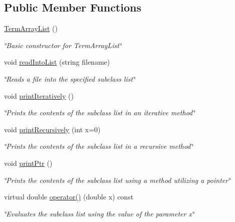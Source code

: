 \subsection*{Public Member Functions}
\begin{DoxyCompactItemize}
\item 
\hypertarget{classTermArrayList_a6c4ad3fa148ee300e41f1d8fae021451}{\hyperlink{classTermArrayList_a6c4ad3fa148ee300e41f1d8fae021451}{Term\-Array\-List} ()}\label{classTermArrayList_a6c4ad3fa148ee300e41f1d8fae021451}

\begin{DoxyCompactList}\small\item\em \char`\"{}\-Basic constructor for Term\-Array\-List\char`\"{} \end{DoxyCompactList}\item 
void \hyperlink{classTermArrayList_a7abb9dc265a5d89e31bfa9caf0a0add3}{read\-Into\-List} (string filename)
\begin{DoxyCompactList}\small\item\em \char`\"{}\-Reads a file into the specified subclass list\char`\"{} \end{DoxyCompactList}\item 
\hypertarget{classTermArrayList_a1c6a97fd1ba740bcddd6ee257ff4a088}{void \hyperlink{classTermArrayList_a1c6a97fd1ba740bcddd6ee257ff4a088}{print\-Iteratively} ()}\label{classTermArrayList_a1c6a97fd1ba740bcddd6ee257ff4a088}

\begin{DoxyCompactList}\small\item\em \char`\"{}\-Prints the contents of the subclass list in an iterative method\char`\"{} \end{DoxyCompactList}\item 
void \hyperlink{classTermArrayList_a6777d9358149d683902610c24c4752f6}{print\-Recursively} (int x=0)
\begin{DoxyCompactList}\small\item\em \char`\"{}\-Prints the contents of the subclass list in a recursive method\char`\"{} \end{DoxyCompactList}\item 
\hypertarget{classTermArrayList_a0619e7312f7af5c17ef029995029fa0d}{void \hyperlink{classTermArrayList_a0619e7312f7af5c17ef029995029fa0d}{print\-Ptr} ()}\label{classTermArrayList_a0619e7312f7af5c17ef029995029fa0d}

\begin{DoxyCompactList}\small\item\em \char`\"{}\-Prints the contents of the subclass list using a method utilizing a pointer\char`\"{} \end{DoxyCompactList}\item 
virtual double \hyperlink{classTermArrayList_a890facace1b1acd72df0f500d9279a04}{operator()} (double x) const 
\begin{DoxyCompactList}\small\item\em \char`\"{}\-Evaluates the subclass list using the value of the parameter x\char`\"{} \end{DoxyCompactList}\end{DoxyCompactItemize}


